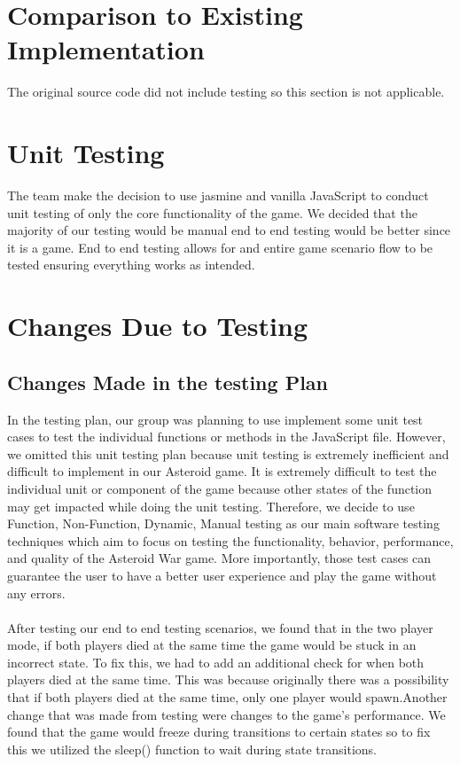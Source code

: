 \documentclass[12pt, titlepage]{article}
\begin{document}
\newpage






	
\section{Comparison to Existing Implementation}	

The original source code did not include testing so this section is not applicable.

\section{Unit Testing}
The team make the decision to use jasmine and vanilla JavaScript to conduct unit testing of only the core functionality of the game. We decided that the majority of our testing would be manual end to end testing would be better since it is a game. End to end testing allows for and entire game scenario flow to be tested ensuring everything works as intended.
\section{Changes Due to Testing}
\subsection{Changes Made in the testing Plan}
In the testing plan, our group was planning to use implement some unit test cases to test the individual functions or methods in the JavaScript file. However, we omitted this unit testing plan because unit testing is extremely inefficient and difficult to implement in our Asteroid game. It is extremely difficult to test the individual unit or component of the game because other states of the function may get impacted while doing the unit testing. Therefore, we decide to use Function, Non-Function, Dynamic, Manual testing as our main software testing techniques which aim to focus on testing the functionality, behavior, performance, and quality of the Asteroid War game. More importantly, those test cases can guarantee the user to have a better user experience and play the game without any errors.
\\ \\
After testing our end to end testing scenarios, we found that in the two player mode, if both players died at the same time the game would be stuck in an incorrect state. To fix this, we had to add an additional check for  when  both  players  died at the same time. This was because originally there was a possibility that if both players died at the same time, only one player would spawn.Another change that was made from testing were changes to the game’s performance. We found that the game would freeze during transitions to certain states so to fix this we utilized the sleep() function to wait during state transitions.
\end{document}
